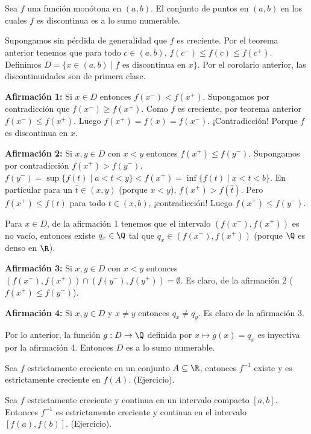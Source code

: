 \begin{teorema} %
Sea $f$ una función monótona en $(a,b)$. El conjunto de puntos en $(a,b)$ en los cuales $f$ es discontinua es a lo sumo numerable. %
\end{teorema}

\begin{dem} %
Supongamos sin pérdida de generalidad que $f$ es creciente. %
Por el teorema anterior tenemos que para todo $c \in (a,b)$, $f(c^-) \le f(c) \le f(c^+)$. %
Definimos $D = \{x \in (a,b) \mid f \text{ es discontinua en } x\}$. %
Por el corolario anterior, las discontinuidades son de primera clase. %

\textbf{Afirmación 1:} Si $x \in D$ entonces $f(x^-) < f(x^+)$. %
Supongamos por contradicción que $f(x^-) \ge f(x^+)$. %
Como $f$ es creciente, por teorema anterior $f(x^-) \le f(x^+)$. %
Luego $f(x^+) = f(x) = f(x^-)$. ¡Contradicción! Porque $f$ es discontinua en $x$. %

\textbf{Afirmación 2:} Si $x, y \in D$ con $x < y$ entonces $f(x^+) \le f(y^-)$. %
Supongamos por contradicción $f(x^+) > f(y^-)$. %
$f(y^-) = \sup\{f(t) \mid a < t < y\} < f(x^+) = \inf\{f(t) \mid x < t < b\}$. %
En particular para un $\hat{t} \in (x,y)$ (porque $x < y$), $f(x^+) > f(\hat{t})$. %
Pero $f(x^+) \le f(t)$ para todo $t \in (x,b)$, ¡contradicción! %
Luego $f(x^+) \le f(y^-)$. %

Para $x \in D$, de la afirmación 1 tenemos que el intervalo $(f(x^-), f(x^+))$ es no vacío, entonces existe $q_x \in \Q$ tal que $q_x \in (f(x^-), f(x^+))$ (porque $\Q$ es denso en $\R$). %

\textbf{Afirmación 3:} Si $x,y \in D$ con $x < y$ entonces $(f(x^-), f(x^+)) \cap (f(y^-), f(y^+)) = \emptyset$. %
Es claro, de la afirmación 2 ($f(x^+) \le f(y^-)$). %

\textbf{Afirmación 4:} Si $x, y \in D$ y $x \neq y$ entonces $q_x \neq q_y$. %
Es claro de la afirmación 3. %

Por lo anterior, la función $g: D \to \Q$ definida por $x \mapsto g(x) = q_x$ es inyectiva por la afirmación 4. %
Entonces $D$ es a lo sumo numerable. %
\end{dem}

\begin{teorema} %
Sea $f$ estrictamente creciente en un conjunto $A \subseteq \R$, entonces $f^{-1}$ existe y es estrictamente creciente en $f(A)$. (Ejercicio). %
\end{teorema}

\begin{teorema} %
Sea $f$ estrictamente creciente y continua en un intervalo compacto $[a,b]$. %
Entonces $f^{-1}$ es estrictamente creciente y continua en el intervalo $[f(a), f(b)]$. (Ejercicio). %
\end{teorema}